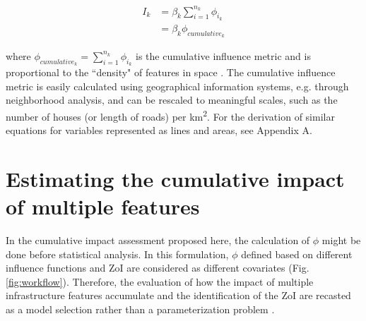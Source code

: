 \documentclass[titlepage]{article}
\begin{document}
\begin{equation}
\label{eqn:HSFcuminf}
\begin{split}
    I_k & = \beta_k \sum_{i=1}^{n_k} \phi_{i_k} \\
        & = \beta_k \phi_{cumulative_k}
\end{split}
\end{equation}

where $\phi_{cumulative_k} = \sum_{i=1}^{n_k} \phi_{i_k}$ is the cumulative influence metric and is proportional to 
the ``density" of features in space \citep[e.g.][]{panzacchi_searching_2015}. The cumulative influence metric is easily calculated using geographical information systems, e.g. through neighborhood analysis, and can be rescaled to meaningful scales, such as the number of houses (or length of roads) per km\textsuperscript{2}. For the derivation of similar equations for variables represented as lines and areas, see Appendix A.

\section{Estimating the cumulative impact of multiple features}

In the cumulative impact assessment proposed here, the calculation of $\phi$ might be done before statistical analysis. In this formulation, $\phi$ defined based on different influence functions and ZoI are considered as different covariates (Fig. \ref{fig:workflow}). Therefore, the evaluation of how the impact of multiple infrastructure features accumulate and the identification of the ZoI are recasted as a model selection rather than a parameterization problem \citep[such as in][]{lee_estimating_2020}.
\end{document}
